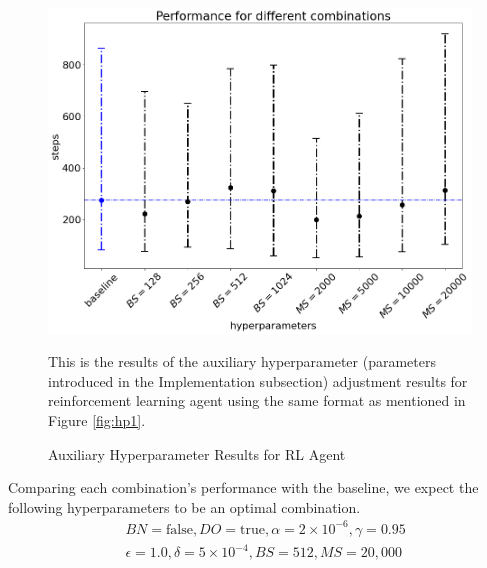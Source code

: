 \documentclass[letterpaper]{article} %
\begin{document}
\begin{itemize}
  \begin{figure}[h!]
    \centering
    \includegraphics[width=0.9\linewidth]{figures/HP2}
    \caption{Auxiliary Hyperparameter Results for RL Agent}
    \medskip
    \footnotesize
    This is the results of the auxiliary hyperparameter (parameters introduced in the Implementation subsection) adjustment results for reinforcement learning agent using the same format as mentioned in Figure \ref{fig:hp1}.
    \label{fig:hp2}
  \end{figure}

  Comparing each combination's performance with the baseline, we expect the following hyperparameters to be an optimal combination.
  \begin{align*}
    &BN=\text{false}, DO=\text{true}, \alpha=2\times 10^{-6}, \gamma = 0.95\\
    &\epsilon=1.0,\delta=5\times 10^{-4}, BS=512, MS=20,000
  \end{align*}


\end{itemize}
\end{document}
